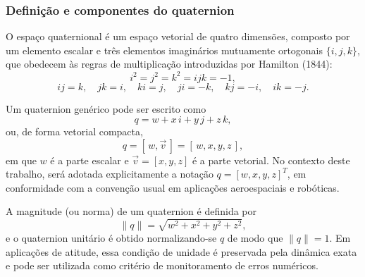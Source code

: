 \subsubsection{Definição e componentes do quaternion}
\label{sec:componentes_quaternion}

O espaço quaternional é um espaço vetorial de quatro dimensões, composto por um elemento escalar e três elementos imaginários mutuamente ortogonais $\{i,j,k\}$, que obedecem às regras de multiplicação introduzidas por Hamilton (1844):
\begin{equation}
i^2 = j^2 = k^2 = ijk = -1,
\label{eq:hamilton_quadrados}
\end{equation}
\begin{equation}
ij = k,\quad jk = i,\quad ki = j,\quad
ji = -k,\quad kj = -i,\quad ik = -j.
\label{eq:hamilton_produtos}
\end{equation}

Um quaternion genérico pode ser escrito como
\begin{equation}
q = w + x\,i + y\,j + z\,k,
\label{eq:quaternion_forma}
\end{equation}
ou, de forma vetorial compacta,
\begin{equation}
q = [\,w,\vec{v}\,] = [\,w,x,y,z\,],
\label{eq:quaternion_wxyz}
\end{equation}
em que $w$ é a parte escalar e $\vec{v} = [x,y,z]$ é a parte vetorial. No contexto deste trabalho, será adotada explicitamente a notação $q = [w,x,y,z]^T$, em conformidade com a convenção usual em aplicações aeroespaciais e robóticas.

A magnitude (ou norma) de um quaternion é definida por
\begin{equation}
\|q\| = \sqrt{w^2 + x^2 + y^2 + z^2},
\label{eq:norma_quaternion}
\end{equation}
e o quaternion unitário é obtido normalizando-se $q$ de modo que $\|q\| = 1$. Em aplicações de atitude, essa condição de unidade é preservada pela dinâmica exata e pode ser utilizada como critério de monitoramento de erros numéricos.

